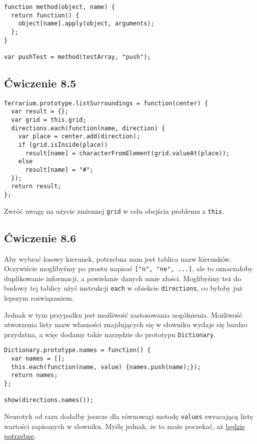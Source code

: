     
\begin{verbatim} 
function method(object, name) {
  return function() {
    object[name].apply(object, arguments);
  };
}

var pushTest = method(testArray, "push");
\end{verbatim}

  
\subsection*{Ćwiczenie 8.5}
\label{sol:8.5}
    
\begin{verbatim} 
Terrarium.prototype.listSurroundings = function(center) {
  var result = {};
  var grid = this.grid;
  directions.each(function(name, direction) {
    var place = center.add(direction);
    if (grid.isInside(place))
      result[name] = characterFromElement(grid.valueAt(place));
    else
      result[name] = "#";
  });
  return result;
};
\end{verbatim}
    
Zwróć uwagę na użycie zmiennej \texttt{grid} w celu obejścia problemu z \texttt{this}.

  
\subsection*{Ćwiczenie 8.6}
\label{sol:8.6}
    
Aby wybrać losowy kierunek, potrzebna nam jest tablica nazw kierunków. Oczywiście moglibyśmy po prostu napisać \texttt{["n", "ne", ...]}, ale to oznaczałoby duplikowanie informacji, a powielanie danych mnie złości. Moglibyśmy też do budowy tej tablicy użyć instrukcji \texttt{each} w obiekcie \texttt{directions}, co byłoby już lepszym rozwiązaniem.
    
Jednak w tym przypadku jest możliwość zastosowania uogólnienia. Możliwość utworzenia listy nazw własności znajdujących się w słowniku wydaje się bardzo przydatna, a więc dodamy takie narzędzie do prototypu \texttt{Dictionary}.
    
\begin{verbatim} 
Dictionary.prototype.names = function() {
  var names = [];
  this.each(function(name, value) {names.push(name);});
  return names;
};

show(directions.names());
\end{verbatim}
    
Neurotyk od razu dodałby jeszcze dla równowagi metodę \texttt{values} zwracającą listę wartości zapisanych w słowniku. Myślę jednak, że to może poczekać, aż \href{http://www.c2.com/cgi/wiki?YouArentGonnaNeedIt}{będzie potrzebne}.
    
